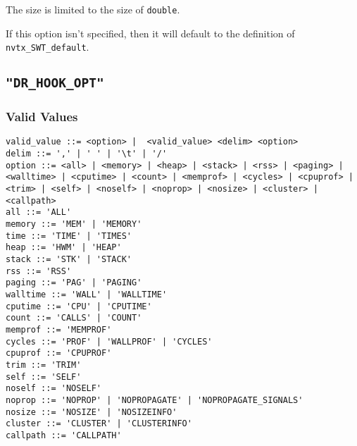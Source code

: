 The size is limited to the size of \verb|double|.

If this option isn't specified, then it will default to the definition of \verb|nvtx_SWT_default|.


\subsection{\texttt{"DR\_HOOK\_OPT"}}
\label{section:flags:DR_HOOK_OPT}
\vspace{-2ex}
\subsubsection{Valid Values}
\vspace{-2ex}
\verb+valid_value ::= <option> |  <valid_value> <delim> <option>+ \\
\verb+delim ::= ',' | ' ' | '\t' | '/'+ \\
\verb+option ::= <all> | <memory> | <heap> | <stack> | <rss> | <paging> |+\\
\verb+<walltime> | <cputime> | <count> | <memprof> | <cycles> | <cpuprof> |+\\
\verb+<trim> | <self> | <noself> | <noprop> | <nosize> | <cluster> | <callpath>+ \\
\verb+all ::= 'ALL'+ \\
\verb+memory ::= 'MEM' | 'MEMORY'+ \\
\verb+time ::= 'TIME' | 'TIMES'+ \\
\verb+heap ::= 'HWM' | 'HEAP'+ \\
\verb+stack ::= 'STK' | 'STACK'+ \\
\verb+rss ::= 'RSS'+ \\
\verb+paging ::= 'PAG' | 'PAGING'+ \\
\verb+walltime ::= 'WALL' | 'WALLTIME'+ \\
\verb+cputime ::= 'CPU' | 'CPUTIME'+ \\
\verb+count ::= 'CALLS' | 'COUNT'+ \\
\verb+memprof ::= 'MEMPROF'+ \\
\verb+cycles ::= 'PROF' | 'WALLPROF' | 'CYCLES'+ \\
\verb+cpuprof ::= 'CPUPROF'+ \\
\verb+trim ::= 'TRIM'+ \\
\verb+self ::= 'SELF'+ \\
\verb+noself ::= 'NOSELF'+ \\
\verb+noprop ::= 'NOPROP' | 'NOPROPAGATE' | 'NOPROPAGATE_SIGNALS'+ \\
\verb+nosize ::= 'NOSIZE' | 'NOSIZEINFO'+ \\
\verb+cluster ::= 'CLUSTER' | 'CLUSTERINFO'+ \\
\verb+callpath ::= 'CALLPATH'+ \\

